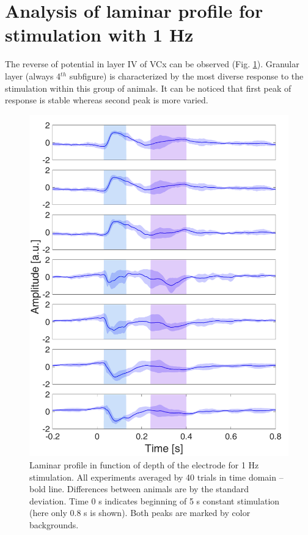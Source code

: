 \documentclass{pracalicmgr}
\begin{document}
    
    \section{Analysis of laminar profile for stimulation with 1 Hz}
    The reverse of potential in layer IV of VCx can be observed (Fig. \ref{rys:srednie_1Hz_1s}). Granular layer (always 4$^{th}$ subfigure) is characterized by the most diverse response to the stimulation within this group of animals. It can be noticed that first peak of response is stable whereas second peak is more varied. 
	\begin{figure}[H]
		\centering
		\includegraphics[scale=0.4]{usrednianie_z_tlem.png}
		\caption{Laminar profile in function of depth of the electrode for 1 Hz stimulation. All experiments averaged by 40 trials in time domain -- bold line. Differences between animals are by the standard deviation. Time 0 s indicates beginning of 5 s constant stimulation (here only 0.8 s is shown). Both peaks are marked by color backgrounds.}
  		\label{rys:srednie_1Hz_1s}
\end{figure}
\end{document}

